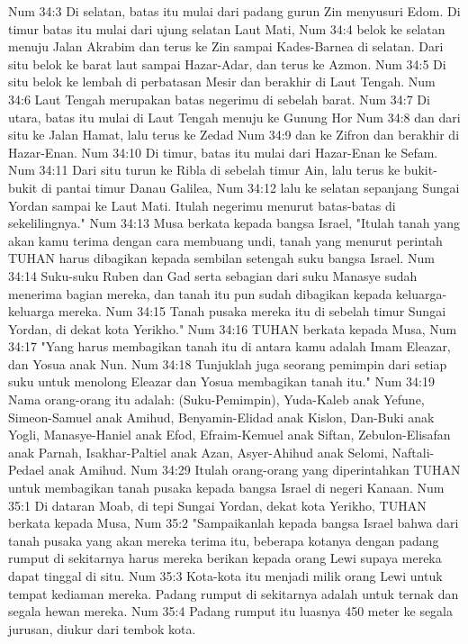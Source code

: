 Num 34:3  Di selatan, batas itu mulai dari padang gurun Zin menyusuri Edom. Di timur batas itu mulai dari ujung selatan Laut Mati,
Num 34:4  belok ke selatan menuju Jalan Akrabim dan terus ke Zin sampai Kades-Barnea di selatan. Dari situ belok ke barat laut sampai Hazar-Adar, dan terus ke Azmon.
Num 34:5  Di situ belok ke lembah di perbatasan Mesir dan berakhir di Laut Tengah.
Num 34:6  Laut Tengah merupakan batas negerimu di sebelah barat.
Num 34:7  Di utara, batas itu mulai di Laut Tengah menuju ke Gunung Hor
Num 34:8  dan dari situ ke Jalan Hamat, lalu terus ke Zedad
Num 34:9  dan ke Zifron dan berakhir di Hazar-Enan.
Num 34:10  Di timur, batas itu mulai dari Hazar-Enan ke Sefam.
Num 34:11  Dari situ turun ke Ribla di sebelah timur Ain, lalu terus ke bukit-bukit di pantai timur Danau Galilea,
Num 34:12  lalu ke selatan sepanjang Sungai Yordan sampai ke Laut Mati. Itulah negerimu menurut batas-batas di sekelilingnya."
Num 34:13  Musa berkata kepada bangsa Israel, "Itulah tanah yang akan kamu terima dengan cara membuang undi, tanah yang menurut perintah TUHAN harus dibagikan kepada sembilan setengah suku bangsa Israel.
Num 34:14  Suku-suku Ruben dan Gad serta sebagian dari suku Manasye sudah menerima bagian mereka, dan tanah itu pun sudah dibagikan kepada keluarga-keluarga mereka.
Num 34:15  Tanah pusaka mereka itu di sebelah timur Sungai Yordan, di dekat kota Yerikho."
Num 34:16  TUHAN berkata kepada Musa,
Num 34:17  "Yang harus membagikan tanah itu di antara kamu adalah Imam Eleazar, dan Yosua anak Nun.
Num 34:18  Tunjuklah juga seorang pemimpin dari setiap suku untuk menolong Eleazar dan Yosua membagikan tanah itu."
Num 34:19  Nama orang-orang itu adalah: (Suku-Pemimpin), Yuda-Kaleb anak Yefune, Simeon-Samuel anak Amihud, Benyamin-Elidad anak Kislon, Dan-Buki anak Yogli, Manasye-Haniel anak Efod, Efraim-Kemuel anak Siftan, Zebulon-Elisafan anak Parnah, Isakhar-Paltiel anak Azan, Asyer-Ahihud anak Selomi, Naftali-Pedael anak Amihud.
Num 34:29  Itulah orang-orang yang diperintahkan TUHAN untuk membagikan tanah pusaka kepada bangsa Israel di negeri Kanaan.
Num 35:1  Di dataran Moab, di tepi Sungai Yordan, dekat kota Yerikho, TUHAN berkata kepada Musa,
Num 35:2  "Sampaikanlah kepada bangsa Israel bahwa dari tanah pusaka yang akan mereka terima itu, beberapa kotanya dengan padang rumput di sekitarnya harus mereka berikan kepada orang Lewi supaya mereka dapat tinggal di situ.
Num 35:3  Kota-kota itu menjadi milik orang Lewi untuk tempat kediaman mereka. Padang rumput di sekitarnya adalah untuk ternak dan segala hewan mereka.
Num 35:4  Padang rumput itu luasnya 450 meter ke segala jurusan, diukur dari tembok kota.
